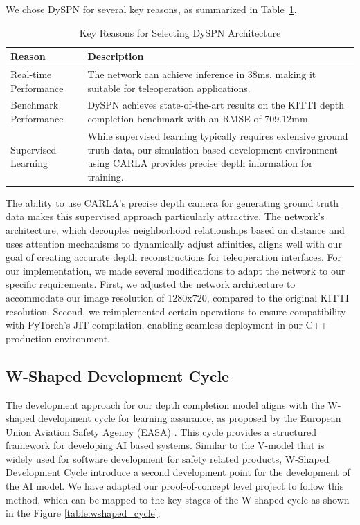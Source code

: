 We chose DySPN for several key reasons, as summarized in Table~\ref{table:dyspn_reasons}.

\begin{table}[h!]
\centering
\begin{tabular}{@{}p{4.5cm}p{9.3cm}@{}}
\toprule
\textbf{Reason} & \textbf{Description} \\
\midrule
Real-time Performance & The network can achieve inference in 38ms, making it suitable for teleoperation applications. \\
\midrule
Benchmark Performance & DySPN achieves state-of-the-art results on the KITTI depth completion benchmark with an RMSE of 709.12mm. \\
\midrule
Supervised Learning  & While supervised learning typically requires extensive ground truth data, our simulation-based development environment using CARLA provides precise depth information for training. \\
\bottomrule
\end{tabular}
\caption{Key Reasons for Selecting DySPN Architecture}
\label{table:dyspn_reasons}
\end{table}

The ability to use CARLA's precise depth camera for generating ground truth data makes this supervised approach particularly attractive. The network's architecture, which decouples neighborhood relationships based on distance and uses attention mechanisms to dynamically adjust affinities, aligns well with our goal of creating accurate depth reconstructions for teleoperation interfaces.
For our implementation, we made several modifications to adapt the network to our specific requirements. First, we adjusted the network architecture to accommodate our image resolution of 1280x720, compared to the original KITTI resolution. Second, we reimplemented certain operations to ensure compatibility with PyTorch's JIT compilation, enabling seamless deployment in our C++ production environment.

\subsection{W-Shaped Development Cycle}
The development approach for our depth completion model aligns with the W-shaped development cycle for learning assurance, as proposed by the European Union Aviation Safety Agency (EASA) \cite{easa2024}. This cycle provides a structured framework for developing \ac{AI} based systems.
Similar to the V-model \cite{vmodel} that is widely used for software development for safety related products, W-Shaped Development Cycle introduce a second development point for the development of the \ac{AI} model.
We have adapted our proof-of-concept level project to follow this method, which can be mapped to the key stages of the W-shaped cycle as shown in the Figure \ref{table:wshaped_cycle}.

